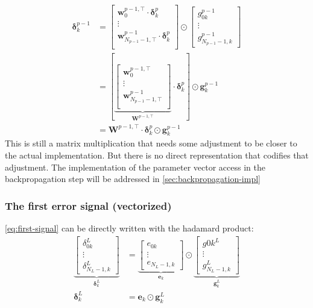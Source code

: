 \begin{align}
	\boldsymbol{\delta}_k^{p-1}&=\begin{bmatrix}
		\boldsymbol{w}_0^{p-1,\top}\cdot \boldsymbol{\delta}_k^{p}\\\vdots\\ \boldsymbol{w}_{N_{p-1}-1,\top}^{p-1}\cdot\boldsymbol{\delta}_k^{p}\\
	\end{bmatrix}\odot\begin{bmatrix}
		g_{0k}^{p-1}\\ \vdots \\
		g_{N_{p-1}-1,k}^{p-1}
	\end{bmatrix}\\
	&=\left[\underset{\boldsymbol{W}^{p-1,\top}}{\underbrace{\begin{bmatrix}
				\boldsymbol{w}_0^{p-1,\top}\\\vdots\\ \boldsymbol{w}_{N_{p-1}-1,\top}^{p-1}\\
	\end{bmatrix}}}\cdot\boldsymbol{\delta}_k^{p}\right]\odot\boldsymbol{g}_k^{p-1}\\
	\label{eq:error_signal_update}
	&=\boldsymbol{W}^{p-1,\top}\cdot\boldsymbol{\delta}_k^{p}\odot\boldsymbol{g}_k^{p-1}
\end{align}
This is still a matrix multiplication that needs some adjustment to be closer to the actual implementation. But there is no direct representation that codifies that adjustment. The implementation of the parameter vector access in the backpropagation step will be addressed in \ref{sec:backpropagation-impl}
\subsubsection{The first error signal (vectorized)}
\eqref{eq:first-signal} can be directly written with the hadamard product:
\begin{align}
	\underset{\boldsymbol{\delta}_k^L}{\underbrace{	\begin{bmatrix}
				\delta_{0k}^L\\\vdots\\\delta^L_{N_{L}-1,k}
	\end{bmatrix}}}&=\underset{\boldsymbol{e}_k}{\underbrace{\begin{bmatrix}
				e_{0k}\\\vdots\\e_{N_{L}-1,k}
	\end{bmatrix}}}\odot\underset{\boldsymbol{g}_k^L}{\underbrace{	\begin{bmatrix}
				g{0k}^L\\\vdots\\g^L_{N_{L}-1,k}
	\end{bmatrix}}}\\
	\boldsymbol{\delta}_k^L&=\boldsymbol{e}_k\odot \boldsymbol{g}_k^L
\end{align}
